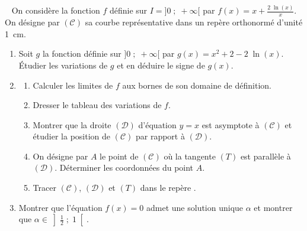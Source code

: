 \begin{exo} ~ \newline
\label{exo:el x plus lnx sur x}
On consid\`ere la fonction $f$ d\'efinie sur $I = ]0 \; ; \; +\infty[$ par $f(x) = x + \frac{2 \; \ln (x) }{x}$.
On d\'esigne par $(\mathscr{C})$ sa courbe repr\'esentative dans un rep\`ere orthonorm\'e \Oij d'unit\'e 1~cm.
\begin{enumerate}
\item Soit $g$ la fonction d\'efinie sur $]0 \; ; \; +\infty[$ par $g(x) = x^2 + 2 - 2 \; \ln (x)$.
      \'Etudier les variations de $g$ et en d\'eduire le signe de $g(x)$.
\item \begin{enumerate}
      \item Calculer les limites de $f$ aux bornes de son domaine de d\'efinition.
      \item Dresser le tableau des variations de $f$.
      \item Montrer que la droite $(\mathcal{D})$ d'\'equation $y = x$ est asymptote \`a $(\mathscr{C})$ et
            \'etudier la position de $(\mathscr{C})$ par rapport \`a $(\mathcal{D})$.
      \item On d\'esigne par $A$ le point de $(\mathscr{C})$ o\`u la tangente $(T)$ est parall\`ele \`a $(\mathcal{D})$.
            D\'eterminer les coordonn\'ees du point $A$.
      \item Tracer $(\mathscr{C})$, $(\mathcal{D})$ et $(T)$ dans le rep\`ere \Oij.
      \end{enumerate}
\item Montrer que l'\'equation $f(x) = 0$ admet une solution unique $\alpha$ et
      montrer que $\alpha \in \left] \frac{1}{2} \; ; \; 1 \right[$.
\end{enumerate}
\end{exo}
